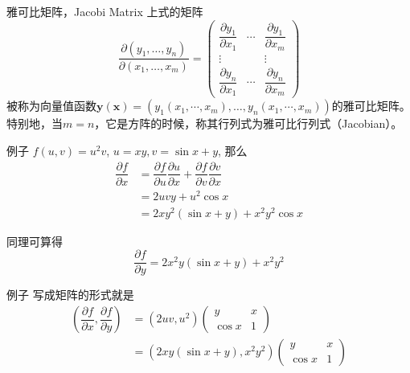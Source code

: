 
\begin{frame}

\begin{block}{雅可比矩阵，Jacobi Matrix}
上式的矩阵
\[\dfrac{\partial(y_1,\ldots,y_n)}{\partial(x_1,\ldots,x_m)} = \begin{pmatrix}
\dfrac{\partial y_1}{\partial x_1} & \cdots & \dfrac{\partial y_1}{\partial x_m} \\
\vdots & & \vdots \\
\dfrac{\partial y_n}{\partial x_1} & \cdots & \dfrac{\partial y_n}{\partial x_m}
\end{pmatrix}\]
被称为向量值函数$\mathbf{y}(\mathbf{x}) = (y_1(x_1,\cdots,x_m), \ldots, y_n(x_1,\cdots,x_m))$的雅可比矩阵。特别地，当$m=n$，它是方阵的时候，称其行列式为雅可比行列式（Jacobian）。
\end{block}

\end{frame}


\begin{frame}

\begin{block}{例子}
$f(u,v) = u^2v$, $u = xy, v=\sin x + y$, 那么
\begin{align*}
\dfrac{\partial f}{\partial x} & = \dfrac{\partial f}{\partial u}\dfrac{\partial u}{\partial x} + \dfrac{\partial f}{\partial v}\dfrac{\partial v}{\partial x} \\
& = 2uvy + u^2\cos x \\
& = 2xy^2(\sin x + y) + x^2y^2\cos x
\end{align*}

\pause
同理可算得
\[\displaystyle \dfrac{\partial f}{\partial y} = 2x^2y(\sin x + y) + x^2y^2\]
\end{block}

\end{frame}


\begin{frame}

\begin{block}{例子}
写成矩阵的形式就是
\begin{align*}
(\dfrac{\partial f}{\partial x}, \dfrac{\partial f}{\partial y}) & = (2uv, u^2) \begin{pmatrix}
y & x \\ \cos x & 1 \end{pmatrix} \\
& = (2xy(\sin x + y), x^2y^2) \begin{pmatrix}
y & x \\ \cos x & 1 \end{pmatrix}
\end{align*}
\end{block}

\end{frame}

